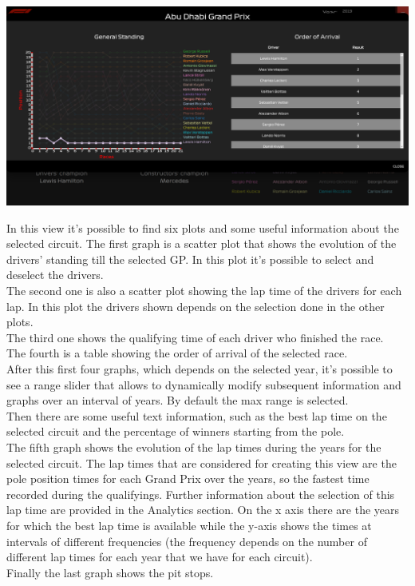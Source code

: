 \documentclass[11pt,twocolumn,letterpaper]{article}
\begin{document}
\begin{center}
	\centering
	\includegraphics[width=\columnwidth]{map-clicked}
\end{center}
In this view it's possible to find six plots and some useful information about the selected circuit.
The first graph is a scatter plot that shows the evolution of the drivers' standing till the selected GP. In this plot it's possible to select and deselect the drivers. \\
The second one is also a scatter plot showing the lap time of the drivers for each lap. In this plot the drivers shown depends on the selection done in the other plots.\\
The third one shows the qualifying time of each driver who finished the race. \\
The fourth is a table showing the order of arrival of the selected race. \\
After this first four graphs, which depends on the selected year, it's possible to see a range slider that allows to dynamically modify subsequent information and graphs over an interval of years. By default the max range is selected. \\
Then there are some useful text information, such as the best lap time on the selected circuit and the percentage of winners starting from the pole. \\
The fifth graph shows the evolution of the lap times during the years for the selected circuit. The lap times that are considered for creating this view are the pole position times for each Grand Prix over the years, so the fastest time recorded during the qualifyings. Further information about the selection of this lap time are provided in the Analytics section. On the x axis there are the years for which the best lap time is available while the y-axis shows the times at intervals of different frequencies (the frequency depends on the number of different lap times for each year that we have for each circuit). \\
Finally the last graph shows the pit stops.
\end{document}
